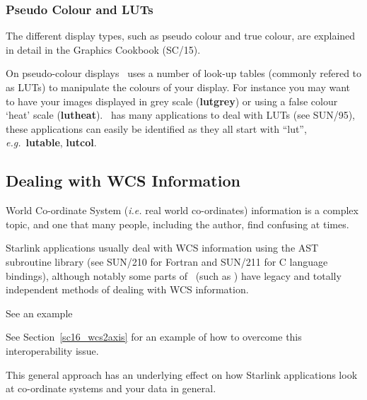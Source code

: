 \documentclass[twoside,11pt]{article}
\newcommand{\htmlref}[2]{#1}
\newcommand{\latex}[1]{#1}
\newcommand{\xref}[3]{#1}
\newcommand{\xlabel}[1]{}
\begin{document}
{\subsubsection{Pseudo Colour and LUTs}

The different display types, such as \xref{pseudo
colour}{sc15}{sc15_pseudo} and \xref{true colour}{sc15}{sc15_true},
are explained in detail in the \xref{Graphics Cookbook}{sc15}{} (SC/15).

On \xref{pseudo-colour displays}{sc15}{sc15_pseudo} \KAPPA\ uses a
number of \xref{look-up tables}{sun95}{se_lookuptables} (commonly
refered to as LUTs) to manipulate the colours of your display.  For
instance you may want to have your images displayed in grey scale
(\xref{{\bf lutgrey}}{sun95}{LUTGREY}) or using a false colour `heat'
scale (\xref{{\bf lutheat}}{sun95}{LUTHEAT}).  \KAPPA\ has many applications to
deal with LUTs (see \xref{SUN/95}{sun95}{}), these applications can
easily be identified as they all start with ``lut'', \emph{e.g.}\
\xref{{\bf lutable}}{sun95}{LUTABLE}, \xref{{\bf lutcol}}{sun95}{LUTCOL}.

\subsection{\xlabel{sc16_wcs}Dealing with WCS Information\label{sc16_wcs}}

\xref{World Co-ordinate System}{sun95}{se_wcsuse} (\emph{i.e.} real
world co-ordinates) information is a complex topic, and one that many people,
including the author, find confusing at times.

Starlink applications usually deal with WCS information using the
\xref{\footnotesize{AST}\normalsize}{sun210}{} subroutine library (see
SUN/210 for Fortran and \xref{SUN/211}{sun211}{} for C language
bindings), although notably some parts of \FIGARO\ (such as \SPECDRE)
have legacy and totally independent methods of dealing with WCS
information. 
\begin{htmlonly}
See \htmlref{an example}{sc16_wcs2axis}
\end{htmlonly} 
\latex{See Section~\ref{sc16_wcs2axis} for an example}
of how to overcome this interoperability issue.

This general approach has an underlying effect on how
Starlink applications look at co-ordinate systems and your data in
general.

}
\end{document}
